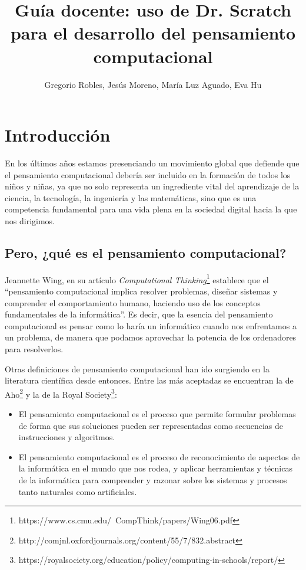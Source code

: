 \documentclass[a4paper,10pt]{article}
\title{Guía docente: uso de Dr. Scratch para el desarrollo del pensamiento computacional}
\author{Gregorio Robles, Jesús Moreno, María Luz Aguado, Eva Hu}
\begin{document}
\maketitle

\begin{abstract}

\end{abstract}

\section{Introducción}
En los últimos años estamos presenciando un movimiento global que defiende que el pensamiento computacional debería ser incluido en la formación de todos los niños y niñas, ya que no solo representa un ingrediente vital del aprendizaje de la ciencia, la tecnología, la ingeniería y las matemáticas, sino que es una competencia fundamental para una vida plena en la sociedad digital hacia la que nos dirigimos.

\subsection*{Pero, ¿qué es el pensamiento computacional?}
Jeannette Wing, en su artículo \textit{Computational Thinking}\footnote{https://www.cs.cmu.edu/~CompThink/papers/Wing06.pdf} establece que el ``pensamiento computacional implica resolver problemas, diseñar sistemas y comprender el comportamiento humano, haciendo uso de los conceptos fundamentales de la informática''. Es decir, que la esencia del pensamiento computacional es pensar como lo haría un informático cuando nos enfrentamos a un problema, de manera que podamos aprovechar la potencia de los ordenadores para resolverlos.

Otras definiciones de pensamiento computacional han ido surgiendo en la literatura científica desde entonces. Entre las más aceptadas se encuentran la de Aho\footnote{http://comjnl.oxfordjournals.org/content/55/7/832.abstract} y la de la Royal Society\footnote{https://royalsociety.org/education/policy/computing-in-schools/report/}:
\begin{itemize}
 \item El pensamiento computacional es el proceso que permite formular problemas de forma que sus soluciones pueden ser representadas como secuencias de instrucciones y algoritmos.
 \item El pensamiento computacional es el proceso de reconocimiento de aspectos de la informática en el mundo que nos rodea, y aplicar herramientas y técnicas de la informática para comprender y razonar sobre los sistemas y procesos tanto naturales como artificiales.
\end{itemize}
\end{document}

